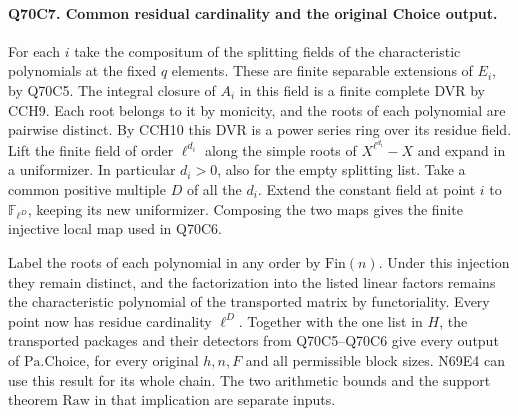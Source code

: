 \paragraph{Q70C7. Common residual cardinality and the original Choice output.}
For each $i$ take the compositum of the splitting fields of the
characteristic polynomials at the fixed $q$ elements. These are
finite separable extensions of $E_i$, by Q70C5. The integral
closure of $A_i$ in this field is a finite complete DVR by CCH9.
Each root belongs to it by monicity, and the roots of each
polynomial are pairwise distinct. By CCH10 this DVR is a power
series ring over its residue field. Lift the finite field of order
$\ell^{d_i}$ along the simple roots of $X^{\ell^{d_i}}-X$ and
expand in a uniformizer. In particular $d_i>0$, also for the
empty splitting list. Take a common positive multiple $D$ of all
the $d_i$. Extend the constant field at point $i$ to
$\mathbb F_{\ell^D}$, keeping its new uniformizer. Composing the
two maps gives the finite injective local map used in Q70C6.

Label the roots of each polynomial in any order by
$\mathrm{Fin}(n)$. Under this injection they remain distinct,
and the factorization into the listed linear factors remains the
characteristic polynomial of the transported matrix by functoriality.
Every point now has residue cardinality $\ell^D$. Together with
the one list in $H$, the transported packages and their detectors
from Q70C5--Q70C6 give every output of $\mathrm{Pa.Choice}$,
for every original $h,n,F$ and all permissible block sizes.
N69E4 can use this result for its whole chain. The two arithmetic
bounds and the support theorem $\mathrm{Raw}$ in that implication
are separate inputs.
